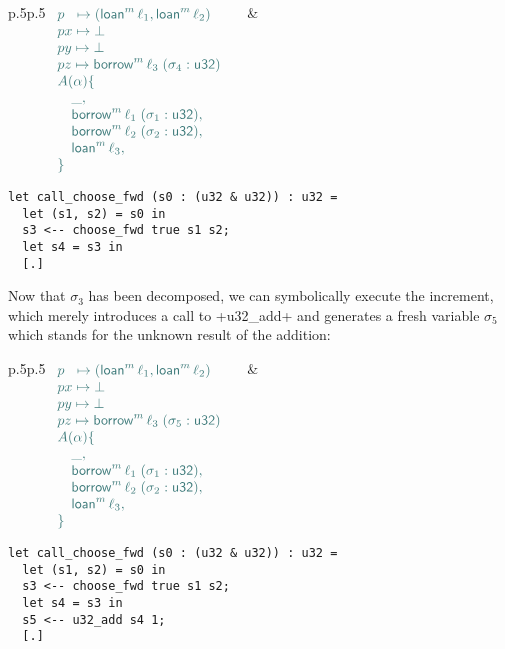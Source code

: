 \documentclass[acmsmall,screen]{acmart}
\newcommand\kw[1]{\ensuremath{\mathsf{#1}}}
\newcommand\emborrow[2]{\ensuremath{\mathsf{borrow}^m\,#1\;#2}}
\newcommand\emloan[1]{\ensuremath{\mathsf{loan}^m\,#1}}
\begin{document}
\medskip
\noindent
\begin{tabular}{p{}p{}}
\small
$
\color{envcolor}
\begin{array}[t]{l}
  p \;\ \mapsto (\emloan\ell_1, \emloan\ell_2) \quad\\
  px \mapsto \bot \quad\\
  py \mapsto \bot \quad\\
  pz \mapsto \emborrow{\ell_3}(\sigma_4 : \kw{u32}) \quad\\
  A(\alpha) \{\\
  \quad \_,\\
  \quad \emborrow{\ell_1}(\sigma_1 : \kw{u32}),\\
  \quad \emborrow{\ell_2}(\sigma_2 : \kw{u32}),\\
  \quad \emloan\ell_3,\\
  \}
\end{array}
$
\normalsize
&
\begin{minipage}[t]{0.5\textwidth}
\begin{verbatim}
let call_choose_fwd (s0 : (u32 & u32)) : u32 =
  let (s1, s2) = s0 in
  s3 <-- choose_fwd true s1 s2;
  let s4 = s3 in
  [.]
\end{verbatim}
\end{minipage}
\end{tabular}

\medskip
\noindent
Now that $\sigma_3$ has been decomposed, we can
symbolically execute the increment, which merely introduces a call to
\li+u32_add+ and generates a fresh variable $\sigma_5$ which stands for the unknown result of the
addition:

\medskip
\noindent
\begin{tabular}{p{}p{}}
\small
$
\color{envcolor}
\begin{array}[t]{l}
  p \;\ \mapsto (\emloan\ell_1, \emloan\ell_2) \quad\\
  px \mapsto \bot \quad\\
  py \mapsto \bot \quad\\
  pz \mapsto \emborrow{\ell_3}(\sigma_5 : \kw{u32}) \quad\\
  A(\alpha) \{\\
  \quad \_,\\
  \quad \emborrow{\ell_1}(\sigma_1 : \kw{u32}),\\
  \quad \emborrow{\ell_2}(\sigma_2 : \kw{u32}),\\
  \quad \emloan\ell_3,\\
  \}
\end{array}
$
\normalsize
&
\begin{minipage}[t]{0.5\textwidth}
\begin{verbatim}
let call_choose_fwd (s0 : (u32 & u32)) : u32 =
  let (s1, s2) = s0 in
  s3 <-- choose_fwd true s1 s2;
  let s4 = s3 in
  s5 <-- u32_add s4 1;
  [.]
\end{verbatim}
\end{minipage}
\end{tabular}
\end{document}
